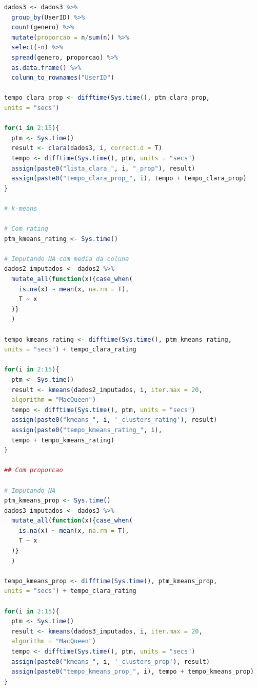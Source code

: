 \documentclass[12pt,a4paper,header]{abnt}
\begin{document}
\begin{lstlisting}[language=R]
dados3 <- dados3 %>% 
  group_by(UserID) %>% 
  count(genero) %>% 
  mutate(proporcao = n/sum(n)) %>% 
  select(-n) %>% 
  spread(genero, proporcao) %>% 
  as.data.frame() %>% 
  column_to_rownames("UserID")

tempo_clara_prop <- difftime(Sys.time(), ptm_clara_prop, 
units = "secs")

for(i in 2:15){
  ptm <- Sys.time()
  result <- clara(dados3, i, correct.d = T)
  tempo <- difftime(Sys.time(), ptm, units = "secs")
  assign(paste0("lista_clara_", i, "_prop"), result)
  assign(paste0("tempo_clara_prop_", i), tempo + tempo_clara_prop)
}

# k-means

# Com rating
ptm_kmeans_rating <- Sys.time()

# Imputando NA com media da coluna
dados2_imputados <- dados2 %>% 
  mutate_all(function(x){case_when(
    is.na(x) ~ mean(x, na.rm = T),
    T ~ x
  )}
  ) 

tempo_kmeans_rating <- difftime(Sys.time(), ptm_kmeans_rating, 
units = "secs") + tempo_clara_rating

for(i in 2:15){
  ptm <- Sys.time()
  result <- kmeans(dados2_imputados, i, iter.max = 20, 
  algorithm = "MacQueen")
  tempo <- difftime(Sys.time(), ptm, units = "secs")
  assign(paste0("kmeans_", i, '_clusters_rating'), result)
  assign(paste0("tempo_kmeans_rating_", i), 
  tempo + tempo_kmeans_rating)
}

## Com proporcao

# Imputando NA
ptm_kmeans_prop <- Sys.time()
dados3_imputados <- dados3 %>% 
  mutate_all(function(x){case_when(
    is.na(x) ~ mean(x, na.rm = T),
    T ~ x
  )}
  ) 

tempo_kmeans_prop <- difftime(Sys.time(), ptm_kmeans_prop, 
units = "secs") + tempo_clara_rating

for(i in 2:15){
  ptm <- Sys.time()
  result <- kmeans(dados3_imputados, i, iter.max = 20, 
  algorithm = "MacQueen")
  tempo <- difftime(Sys.time(), ptm, units = "secs")
  assign(paste0("kmeans_", i, '_clusters_prop'), result)
  assign(paste0("tempo_kmeans_prop_", i), tempo + tempo_kmeans_prop)
}


\end{lstlisting}
\end{document}
